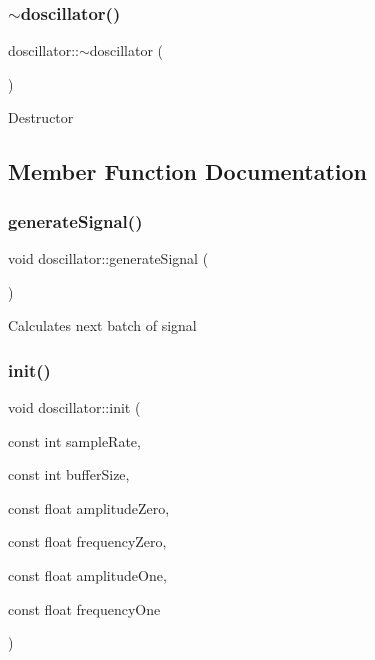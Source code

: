 \subsubsection{\texorpdfstring{$\sim$doscillator()}{~doscillator()}}
{\footnotesize\ttfamily doscillator\+::$\sim$doscillator (\begin{DoxyParamCaption}{ }\end{DoxyParamCaption})}

Destructor 

\subsection{Member Function Documentation}
\mbox{\label{classdoscillator_abdc5fdfd0cc2fd9c83ed62fda3fc286f}} 
\subsubsection{\texorpdfstring{generate\+Signal()}{generateSignal()}}
{\footnotesize\ttfamily void doscillator\+::generate\+Signal (\begin{DoxyParamCaption}{ }\end{DoxyParamCaption})}

Calculates next batch of signal \mbox{\label{classdoscillator_aa683ebbb7aeed37e6a0d7011f6d0e322}} 
\subsubsection{\texorpdfstring{init()}{init()}}
{\footnotesize\ttfamily void doscillator\+::init (\begin{DoxyParamCaption}\item[{const int}]{sample\+Rate,  }\item[{const int}]{buffer\+Size,  }\item[{const float}]{amplitude\+Zero,  }\item[{const float}]{frequency\+Zero,  }\item[{const float}]{amplitude\+One,  }\item[{const float}]{frequency\+One }\end{DoxyParamCaption})}

